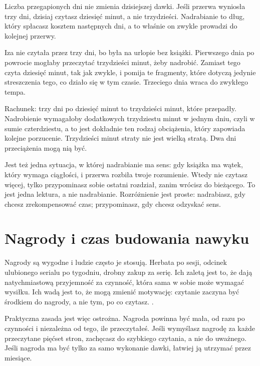 \begin{zasada}
  Liczba przegapionych dni nie zmienia dzisiejszej dawki. Jeśli przerwa wyniosła trzy dni, dzisiaj czytasz dziesięć minut, a nie trzydzieści. Nadrabianie to dług, który spłacasz kosztem następnych dni, a to właśnie on zwykle prowadzi do kolejnej przerwy.
\end{zasada}

\begin{przyklad}
  Iza nie czytała przez trzy dni, bo była na urlopie bez książki. Pierwszego dnia po powrocie mogłaby przeczytać trzydzieści minut, żeby nadrobić. Zamiast tego czyta dziesięć minut, tak jak zwykle, i pomija te fragmenty, które dotyczą jedynie streszczenia tego, co działo się w tym czasie. Trzeciego dnia wraca do zwykłego tempa.

  Rachunek: trzy dni po dziesięć minut to trzydzieści minut, które przepadły. Nadrobienie wymagałoby dodatkowych trzydziestu minut w jednym dniu, czyli w sumie czterdziestu, a to jest dokładnie ten rodzaj obciążenia, który zapowiada kolejne porzucenie. Trzydzieści minut straty nie jest wielką stratą. Dwa dni przeciążenia mogą nią być.
\end{przyklad}

Jest też jedna sytuacja, w której nadrabianie ma sens: gdy książka ma wątek, który wymaga ciągłości, i przerwa rozbiła twoje rozumienie. Wtedy nie czytasz więcej, tylko przypominasz sobie ostatni rozdział, zanim wrócisz do bieżącego. To jest jedna lektura, a nie nadrabianie. Rozróżnienie jest proste: nadrabiasz, gdy chcesz zrekompensować czas; przypominasz, gdy chcesz odzyskać sens.

\section{Nagrody i czas budowania nawyku}

Nagrody są wygodne i ludzie często je stosują. Herbata po sesji, odcinek ulubionego serialu po tygodniu, drobny zakup za serię. Ich zaletą jest to, że dają natychmiastową przyjemność za czynność, która sama w sobie może wymagać wysiłku. Ich wadą jest to, że mogą zmienić motywację: czytanie zaczyna być środkiem do nagrody, a nie tym, po co czytasz. .

Praktyczna zasada jest więc ostrożna. Nagroda powinna być mała, od razu po czynności i niezależna od tego, ile przeczytałeś. Jeśli wymyślasz nagrodę za każde przeczytane pięćset stron, zachęcasz do szybkiego czytania, a nie do uważnego. Jeśli nagroda ma być tylko za samo wykonanie dawki, łatwiej ją utrzymać przez miesiące.

